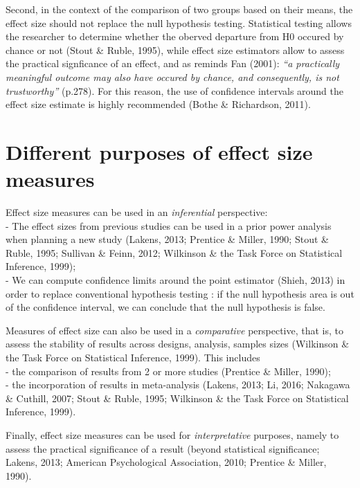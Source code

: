 \documentclass[
  man,floatsintext]{apa6}
\begin{document}
Second, in the context of the comparison of two groups based on their means, the effect size should not replace the null hypothesis testing. Statistical testing allows the researcher to determine whether the oberved departure from H0 occured by chance or not (Stout \& Ruble, 1995), while effect size estimators allow to assess the practical signficance of an effect, and as reminds Fan (2001): \emph{\enquote{a practically meaningful outcome may also have occured by chance, and consequently, is not trustworthy}} (p.278). For this reason, the use of confidence intervals around the effect size estimate is highly recommended (Bothe \& Richardson, 2011).

\hypertarget{different-purposes-of-effect-size-measures}{%
\section{Different purposes of effect size measures}\label{different-purposes-of-effect-size-measures}}

Effect size measures can be used in an \emph{inferential} perspective:\\
- The effect sizes from previous studies can be used in a prior power analysis when planning a new study (Lakens, 2013; Prentice \& Miller, 1990; Stout \& Ruble, 1995; Sullivan \& Feinn, 2012; Wilkinson \& the Task Force on Statistical Inference, 1999);\\
- We can compute confidence limits around the point estimator (Shieh, 2013) in order to replace conventional hypothesis testing : if the null hypothesis area is out of the confidence interval, we can conclude that the null hypothesis is false.

Measures of effect size can also be used in a \emph{comparative} perspective, that is, to assess the stability of results across designs, analysis, samples sizes (Wilkinson \& the Task Force on Statistical Inference, 1999). This includes\\
- the comparison of results from 2 or more studies (Prentice \& Miller, 1990);\\
- the incorporation of results in meta-analysis (Lakens, 2013; Li, 2016; Nakagawa \& Cuthill, 2007; Stout \& Ruble, 1995; Wilkinson \& the Task Force on Statistical Inference, 1999).

Finally, effect size measures can be used for \emph{interpretative} purposes, namely to assess the practical significance of a result (beyond statistical significance; Lakens, 2013; American Psychological Association, 2010; Prentice \& Miller, 1990).
\end{document}
